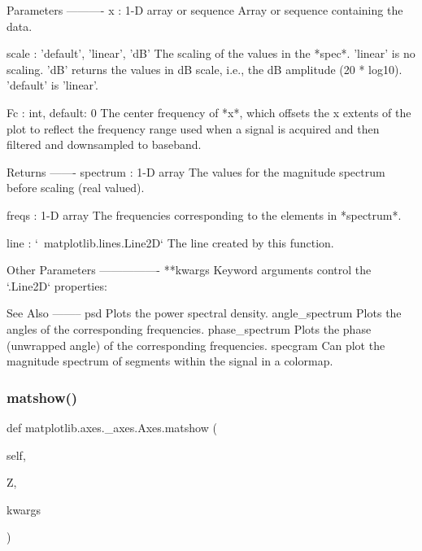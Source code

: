 \begin{DoxyVerb}
\begin{DoxyVerb}
Parameters
----------
x : 1-D array or sequence
    Array or sequence containing the data.



scale : {'default', 'linear', 'dB'}
    The scaling of the values in the *spec*.  'linear' is no scaling.
    'dB' returns the values in dB scale, i.e., the dB amplitude
    (20 * log10). 'default' is 'linear'.

Fc : int, default: 0
    The center frequency of *x*, which offsets the x extents of the
    plot to reflect the frequency range used when a signal is acquired
    and then filtered and downsampled to baseband.

Returns
-------
spectrum : 1-D array
    The values for the magnitude spectrum before scaling (real valued).

freqs : 1-D array
    The frequencies corresponding to the elements in *spectrum*.

line : `~matplotlib.lines.Line2D`
    The line created by this function.

Other Parameters
----------------
**kwargs
    Keyword arguments control the `.Line2D` properties:


See Also
--------
psd
    Plots the power spectral density.
angle_spectrum
    Plots the angles of the corresponding frequencies.
phase_spectrum
    Plots the phase (unwrapped angle) of the corresponding frequencies.
specgram
    Can plot the magnitude spectrum of segments within the signal in a
    colormap.
\end{DoxyVerb}
 \mbox{\label{classmatplotlib_1_1axes_1_1__axes_1_1Axes_a420ee1a42368562ed2fca0eff0052514}} 
\subsubsection{\texorpdfstring{matshow()}{matshow()}}
{\footnotesize\ttfamily def matplotlib.\+axes.\+\_\+axes.\+Axes.\+matshow (\begin{DoxyParamCaption}\item[{}]{self,  }\item[{}]{Z,  }\item[{}]{kwargs }\end{DoxyParamCaption})}


\end{DoxyVerb}
